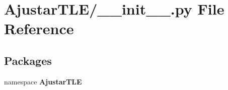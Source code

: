 \section{\-Ajustar\-T\-L\-E/\-\_\-\-\_\-init\-\_\-\-\_\-.py \-File \-Reference}
\label{_ajustar_t_l_e_2____init_____8py}
\subsection*{\-Packages}
\begin{DoxyCompactItemize}
\item 
namespace {\bf \-Ajustar\-T\-L\-E}
\end{DoxyCompactItemize}
